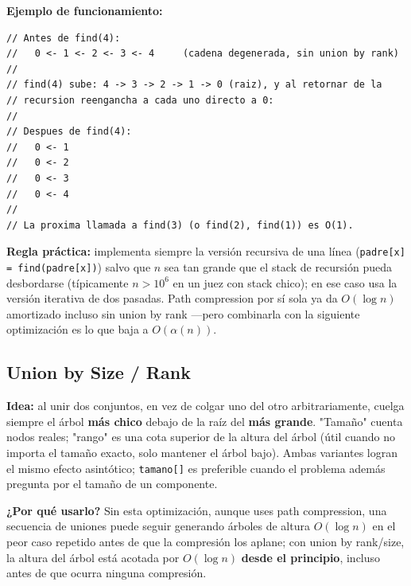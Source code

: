 \documentclass[10pt,a4paper,twocolumn]{article}
\begin{document}
\textbf{Ejemplo de funcionamiento:}

\begin{lstlisting}[style=cpp]
// Antes de find(4):
//   0 <- 1 <- 2 <- 3 <- 4     (cadena degenerada, sin union by rank)
//
// find(4) sube: 4 -> 3 -> 2 -> 1 -> 0 (raiz), y al retornar de la
// recursion reengancha a cada uno directo a 0:
//
// Despues de find(4):
//   0 <- 1
//   0 <- 2
//   0 <- 3
//   0 <- 4
//
// La proxima llamada a find(3) (o find(2), find(1)) es O(1).
\end{lstlisting}

\textbf{Regla práctica:} implementa siempre la versión recursiva de
una línea (\texttt{padre[x] = find(padre[x])}) salvo que $n$ sea tan
grande que el stack de recursión pueda desbordarse (típicamente
$n > 10^6$ en un juez con stack chico); en ese caso usa la versión
iterativa de dos pasadas. Path compression por sí sola ya da
$O(\log n)$ amortizado incluso sin union by rank —pero combinarla con
la siguiente optimización es lo que baja a $O(\alpha(n))$.

\subsection{Union by Size / Rank}

\textbf{Idea:} al unir dos conjuntos, en vez de colgar uno del otro
arbitrariamente, cuelga siempre el árbol \textbf{más chico} debajo de
la raíz del \textbf{más grande}. "Tamaño" cuenta nodos reales;
"rango" es una cota superior de la altura del árbol (útil cuando no
importa el tamaño exacto, solo mantener el árbol bajo). Ambas
variantes logran el mismo efecto asintótico; \texttt{tamano[]} es
preferible cuando el problema además pregunta por el tamaño de un
componente.

\textbf{¿Por qué usarlo?} Sin esta optimización, aunque uses path
compression, una secuencia de uniones puede seguir generando árboles
de altura $O(\log n)$ en el peor caso repetido antes de que la
compresión los aplane; con union by rank/size, la altura del árbol
está acotada por $O(\log n)$ \textbf{desde el principio}, incluso
antes de que ocurra ninguna compresión.
\end{document}
